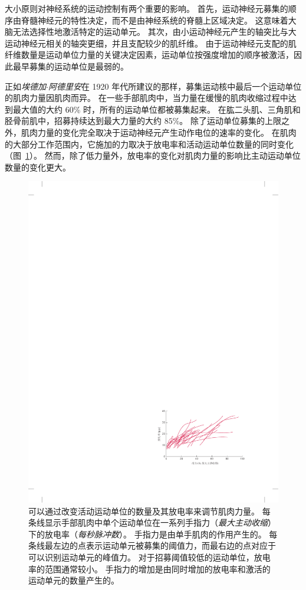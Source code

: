 大小原则对神经系统的运动控制有两个重要的影响。
首先，运动神经元募集的顺序由脊髓神经元的特性决定，而不是由神经系统的脊髓上区域决定。
这意味着大脑无法选择性地激活特定的运动单元。
其次，由小运动神经元产生的轴突比与大运动神经元相关的轴突更细，并且支配较少的肌纤维。
由于运动神经元支配的肌纤维数量是运动单位力量的关键决定因素，运动单位按强度增加的顺序被激活，因此最早募集的运动单位是最弱的。


正如\textit{埃德加$\cdot$阿德里安}在 1920 年代所建议的那样，募集运动核中最后一个运动单位的肌肉力量因肌肉而异。
在一些手部肌肉中，当力量在缓慢的肌肉收缩过程中达到最大值的大约 60\% 时，所有的运动单位都被募集起来。
在肱二头肌、三角肌和胫骨前肌中，招募持续达到最大力量的大约 85\%。
除了运动单位募集的上限之外，肌肉力量的变化完全取决于运动神经元产生动作电位的速率的变化。
在肌肉的大部分工作范围内，它施加的力取决于放电率和活动运动单位数量的同时变化（图~\ref{fig:31_7}）。
然而，除了低力量外，放电率的变化对肌肉力量的影响比主动运动单位数量的变化更大。


\begin{figure}[htbp]
	\centering
	\includegraphics[width=0.63\linewidth]{chap31/fig_31_7}
	\caption{可以通过改变活动运动单位的数量及其放电率来调节肌肉力量。
	每条线显示手部肌肉中单个运动单位在一系列手指力（\textit{最大主动收缩}）下的放电率（\textit{每秒脉冲数}）。
	手指力是由单手肌肉的作用产生的。
	每条线最左边的点表示运动单元被募集的阈值力，而最右边的点对应于可以识别运动单元的峰值力。
	对于招募阈值较低的运动单位，放电率的范围通常较小。
	手指力的增加是由同时增加的放电率和激活的运动单元的数量产生的\cite{moritz2005discharge}。}
	\label{fig:31_7}
\end{figure}


